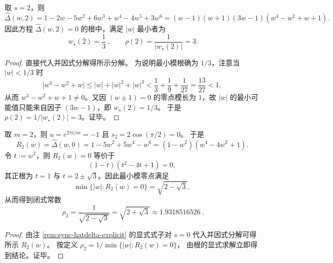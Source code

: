 \begin{corollary}[端点 \(u=1\)（\(s=2\)）的闭式因式分解与最小模根]\label{cor:sync-hatdelta-s2-factorization}
取 \(s=2\)，则
\[
\widehat\Delta(w,2)
=1-2w-5w^2+6w^3+w^4-4w^5+3w^6
=(w-1)(w+1)(3w-1)(w^3-w^2+w+1).
\]
因此方程 \(\widehat\Delta(w,2)=0\) 的根中，满足 \(|w|\) 最小者为
\[
\boxed{\ w_\star(2)=\frac13\ },\qquad \rho(2)=\frac{1}{|w_\star(2)|}=3.
\]
\end{corollary}
\begin{proof}
直接代入并因式分解得所示分解。
为说明最小模根确为 \(1/3\)，注意当 \(|w|<1/3\) 时
\[
\bigl|w^3-w^2+w\bigr|
\le |w|+|w|^2+|w|^3
<\frac13+\frac19+\frac1{27}
=\frac{13}{27}<1,
\]
从而 \(w^3-w^2+w+1\neq 0\)。又因 \((w\pm 1)=0\) 的零点模长为 \(1\)，故 \(|w|\) 的最小可能值只能来自因子 \((3w-1)\)，即 \(w_\star(2)=1/3\)。
于是 \(\rho(2)=1/|w_\star(2)|=3\)。证毕。
\end{proof}

\begin{corollary}[最坏扭曲 \(m=2\) 的闭式谱半径]\label{cor:sync-rho-m2-closed-form}
取 \(m=2\)，则 \(u=e^{2\pi i/m}=-1\) 且
\(
s_2=2\cos(\pi/2)=0
\)。
于是
\[
R_2(w)=\widehat\Delta(w,0)=1-5w^2+5w^4-w^6=(1-w^2)(w^4-4w^2+1).
\]
令 \(t:=w^2\)，则 \(R_2(w)=0\) 等价于
\[
(1-t)(t^2-4t+1)=0,
\]
其正根为 \(t=1\) 与 \(t=2\pm\sqrt3\)。因此最小模零点满足
\[
\min\{|w|:R_2(w)=0\}=\sqrt{2-\sqrt3},
\]
从而得到闭式常数
\[
\boxed{\ \rho_2=\frac{1}{\sqrt{2-\sqrt3}}=\sqrt{2+\sqrt3}\approx 1.9318516526\ }.
\]
\end{corollary}
\begin{proof}
由注 \ref{rem:sync-hatdelta-explicit} 的显式式子对 \(s=0\) 代入并因式分解可得所示 \(R_2(w)\)。
按定义
\(
\rho_2=1/\min\{|w|:R_2(w)=0\}
\)，
由根的显式求解立即得到结论。证毕。
\end{proof}

